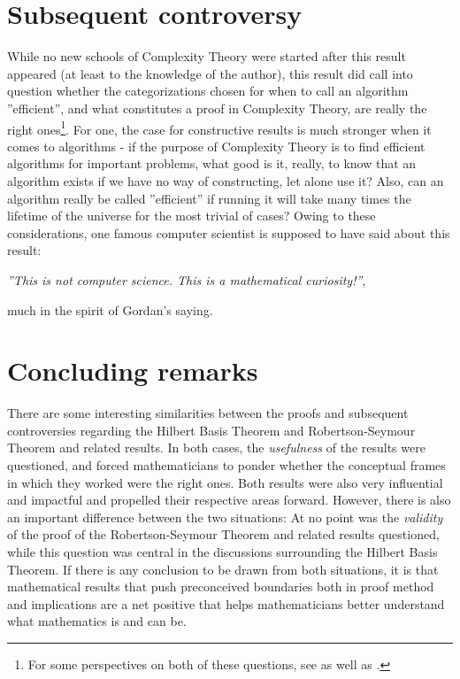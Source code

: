 \section{Subsequent controversy}
While no new schools of Complexity Theory were started after this result appeared (at least to the knowledge of the author), this result did call into question whether the categorizations chosen for when to call an algorithm ''efficient'', and what constitutes a proof in Complexity Theory, are really the right ones\footnote{For some perspectives on both of these questions, see \cite{johnsonNPCompletenessColumnOngoing} as well as \cite[p.~151-152]{downeyParameterizedComplexity1999}.}. For one, the case for constructive results is much stronger when it comes to algorithms - if the purpose of Complexity Theory is to find efficient algorithms for important problems, what good is it, really, to know that an algorithm exists if we have no way of constructing, let alone use it? Also, can an algorithm really be called ''efficient'' if running it will take many times the lifetime of the universe for the most trivial of cases? Owing to these considerations, one famous computer scientist is supposed to have said about this result:
\begin{center}
\emph{''This is not computer science. This is a mathematical curiosity!''}\cite[p.~152]{downeyParameterizedComplexity1999},
\end{center}
much in the spirit of Gordan's saying.

\section{Concluding remarks}
There are some interesting similarities between the proofs and subsequent controversies regarding the Hilbert Basis Theorem and Robertson-Seymour Theorem and related results. In both cases, the \emph{usefulness} of the results were questioned, and forced mathematicians to ponder whether the conceptual frames in which they worked were the right ones. Both results were also very influential and impactful and propelled their respective areas forward. However, there is also an important difference between the two situations: At no point was the \emph{validity} of the proof of the Robertson-Seymour Theorem and related results questioned, while this question was central in the discussions surrounding the Hilbert Basis Theorem. If there is any conclusion to be drawn from both situations, it is that mathematical results that push preconceived boundaries both in proof method and implications are a net positive that helps mathematicians better understand what mathematics is and can be.

\newpage
\printbibliography

